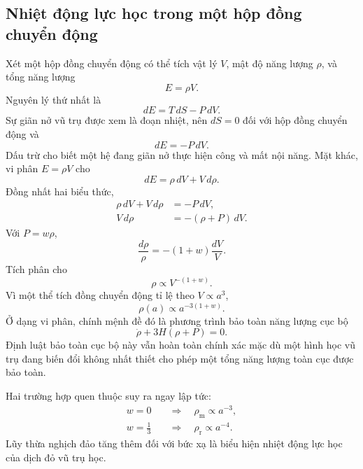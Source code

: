 \subsection{Nhiệt động lực học trong một hộp đồng chuyển động}

Xét một hộp đồng chuyển động có thể tích vật lý \(V\), mật độ năng lượng \(\rho\), và tổng năng lượng
\begin{equation}
E=\rho V.
\end{equation}
Nguyên lý thứ nhất là
\begin{equation}
dE=T\,dS-P\,dV.
\end{equation}
Sự giãn nở vũ trụ được xem là đoạn nhiệt, nên \(dS=0\) đối với hộp đồng chuyển động và
\begin{equation}
dE=-P\,dV.
\label{eq:c04-adiabatic-first-law}
\end{equation}
Dấu trừ cho biết một hệ đang giãn nở thực hiện công và mất nội năng. Mặt khác, vi phân \(E=\rho V\) cho
\begin{equation}
dE=\rho\,dV+V\,d\rho.
\end{equation}
Đồng nhất hai biểu thức,
\begin{align}
\rho\,dV+V\,d\rho&=-P\,dV,\\
V\,d\rho&=-(\rho+P)\,dV.
\label{eq:c04-volume-continuity}
\end{align}
Với \(P=w\rho\),
\begin{equation}
\frac{d\rho}{\rho}=-(1+w)\frac{dV}{V}.
\end{equation}
Tích phân cho
\begin{equation}
\rho\propto V^{-(1+w)}.
\end{equation}
Vì một thể tích đồng chuyển động tỉ lệ theo \(V\propto a^3\),
\begin{equation}
\boxed{\rho(a)\propto a^{-3(1+w)}}.
\label{eq:c04-density-scaling}
\end{equation}
Ở dạng vi phân, chính mệnh đề đó là phương trình bảo toàn năng lượng cục bộ
\begin{equation}
\dot\rho+3H(\rho+P)=0.
\label{eq:c04-continuity}
\end{equation}
Định luật bảo toàn cục bộ này vẫn hoàn toàn chính xác mặc dù một hình học vũ trụ đang biến đổi không nhất thiết cho phép một tổng năng lượng toàn cục được bảo toàn.

Hai trường hợp quen thuộc suy ra ngay lập tức:
\begin{align}
w=0
&\quad\Longrightarrow\quad
\rho_{\mathrm m}\propto a^{-3},\\
w=\frac13
&\quad\Longrightarrow\quad
\rho_{\mathrm r}\propto a^{-4}.
\end{align}
Lũy thừa nghịch đảo tăng thêm đối với bức xạ là biểu hiện nhiệt động lực học của dịch đỏ vũ trụ học.

